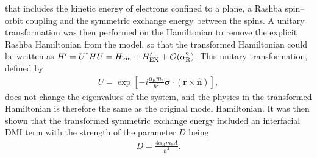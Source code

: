 that includes the kinetic energy of electrons confined to a plane, a Rashba spin--orbit coupling and the symmetric exchange energy between the spins. A unitary transformation was then performed on the Hamiltonian to remove the explicit Rashba Hamiltonian from the model, so that the transformed Hamiltonian could be written as $H' = U^{\dagger} H U = H_{\textrm{kin}} + H_{\text{EX}}' + \mathcal{O}(\alpha_{\text{R}}^2)$. This unitary transformation, defined by
\begin{align}
U = \exp\left[-i\frac{\alpha_{\text{R}} m_e}{\hbar^2}\mathbold{\sigma}\cdot(\mathbold{r}\times\mathbold{\hat{n}})\right],
\end{align}
does not change the eigenvalues of the system, and the physics in the transformed Hamiltonian is therefore the same as the original model Hamiltonian. It was then shown that the transformed symmetric exchange energy included an interfacial DMI term with the strength of the parameter $D$ being
\begin{align}
\label{eq:DalphaR}
D = \frac{4\alpha_{\text{R}}m_e A}{\hbar^2}.
\end{align}

